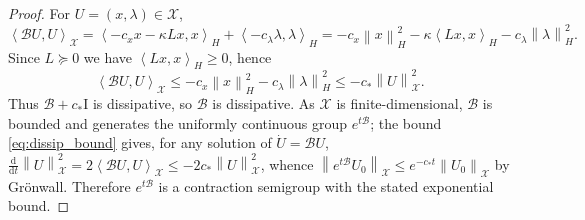 \documentclass[10pt,a4paper]{amsart}
\newcommand{\Bop}{\mathcal{B}}
\newcommand{\X}{\mathcal{X}}
\newcommand{\dd}{\mathrm{d}}
\newcommand{\id}{\mathrm{I}}
\newcommand{\inner}[2]{\left\langle #1, #2 \right\rangle}
\newcommand{\norm}[1]{\left\lVert #1 \right\rVert}
\begin{document}
\begin{proof}
For $U=(x,\lambda)\in\X$,
\[
\inner{\Bop U}{U}_\X
= \inner{-c_x x-\kappa Lx}{x}_H + \inner{-c_\lambda\lambda}{\lambda}_H
= -c_x\norm{x}_H^2 - \kappa\inner{Lx}{x}_H - c_\lambda\norm{\lambda}_H^2 .
\]
Since $L\succeq0$ we have $\inner{Lx}{x}_H\ge0$, hence
\begin{equation}
\label{eq:dissip_bound}
\inner{\Bop U}{U}_\X \le -c_x\norm{x}_H^2 - c_\lambda\norm{\lambda}_H^2
\le -c_\ast\norm{U}_\X^2 .
\end{equation}
Thus $\Bop+c_\ast\id$ is dissipative, so $\Bop$ is dissipative. As $\X$ is finite-dimensional,
$\Bop$ is bounded and generates the uniformly continuous group $e^{t\Bop}$; the bound
\eqref{eq:dissip_bound} gives, for any solution of $\dot U=\Bop U$,
$\tfrac{\dd}{\dd t}\norm{U}_\X^2=2\inner{\Bop U}{U}_\X\le-2c_\ast\norm{U}_\X^2$, whence
$\norm{e^{t\Bop}U_0}_\X\le e^{-c_\ast t}\norm{U_0}_\X$ by Gr\"onwall. Therefore $e^{t\Bop}$ is a
contraction semigroup with the stated exponential bound.
\end{proof}
\end{document}
